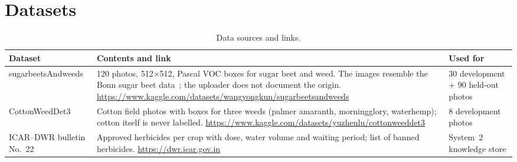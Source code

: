 \section{Datasets}\label{sec:datasets}
\begin{table}[H]
\centering
\caption{Data sources and links.}\label{tab:datasets}
\begin{small}
\begin{tabularx}{\textwidth}{@{}L{3.1cm}YL{2.6cm}@{}}
\toprule
\textbf{Dataset} & \textbf{Contents and link} & \textbf{Used for}\\
\midrule
sugarbeets\-And\-weeds \cite{data_sugarbeets} & 120 photos, 512$\times$512, Pascal VOC boxes for sugar beet and weed. The images resemble the Bonn sugar beet data~\cite{chebrolu2017sugarbeet}; the uploader does not document the origin. \url{https://www.kaggle.com/datasets/wangyongkun/sugarbeetsandweeds} & 30 development + 90 held-out photos\\
Cotton\-Weed\-Det3 \cite{data_cottonweeddet3,rahman2023cotton} & Cotton field photos with boxes for three weeds (palmer amaranth, morningglory, waterhemp); cotton itself is never labelled. \url{https://www.kaggle.com/datasets/yuzhenlu/cottonweeddet3} & 8 development photos\\
ICAR--DWR bulletin No.~22~\cite{choudhury2016icar} & Approved herbicides per crop with dose, water volume and waiting period; list of banned herbicides. \url{https://dwr.icar.gov.in} & System~2 knowledge store\\
\bottomrule
\end{tabularx}
\end{small}
\end{table}

